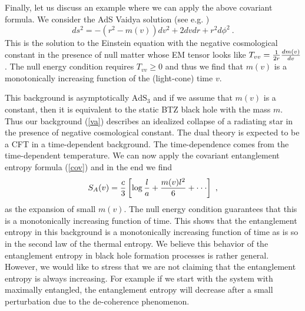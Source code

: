 \documentclass[12pt]{article}
\def\frac#1#2{{#1\over #2}}
\def\frac#1#2{{#1\over #2}}
\begin{document}
Finally, let us discuss an example where we can apply the
above covariant formula. We consider the AdS Vaidya solution (see e.g. \cite{Hub})
\begin{equation}\label{va}
ds^2=-(r^2-m(v))dv^2+2dvdr+r^2d\phi^2\ .
\end{equation}
This is the solution to the Einstein equation with the negative
cosmological constant in the presence of null matter whose EM tensor
looks like $T_{vv}=\frac{1}{2r}\frac{dm(v)}{dv}$. The null energy
condition requires $T_{vv}\geq 0$ and thus we find that $m(v)$ is a
monotonically increasing function of the (light-cone) time $v$.

This background is asymptotically
$\mathrm{AdS}_3$ and if we assume that
$m(v)$ is a constant, then it is equivalent to the static BTZ black
hole \cite{BTZ} with the mass $m$. Thus our background (\ref{va})
describes an idealized collapse of a radiating star in the presence
of negative cosmological constant. The dual theory is expected to be
a CFT in a time-dependent background. The time-dependence comes from
the time-dependent temperature. We can now apply the covariant
entanglement entropy formula (\ref{cov}) and in the end we find
\begin{equation}\label{res}
S_A(v)=\frac{c}{3}\left[\log
\frac{l}{a}+\frac{m(v)l^2}{6}+\cdot\cdot\cdot\right]\ ,
\end{equation}
as the expansion of small $m(v)$. The null energy condition
guarantees that this is a monotonically increasing function of time.
This shows that the entanglement entropy in this background is a
monotonically increasing function of time as is so in the second law
of the thermal entropy. We believe this behavior of
the entanglement
entropy in black hole formation processes is rather general.
However, we would like to stress that we are not claiming that the
entanglement entropy is always increasing. For example if we start
with the system with maximally entangled, the entanglement entropy
will decrease after a small perturbation due to the de-coherence
phenomenon.
\end{document}
